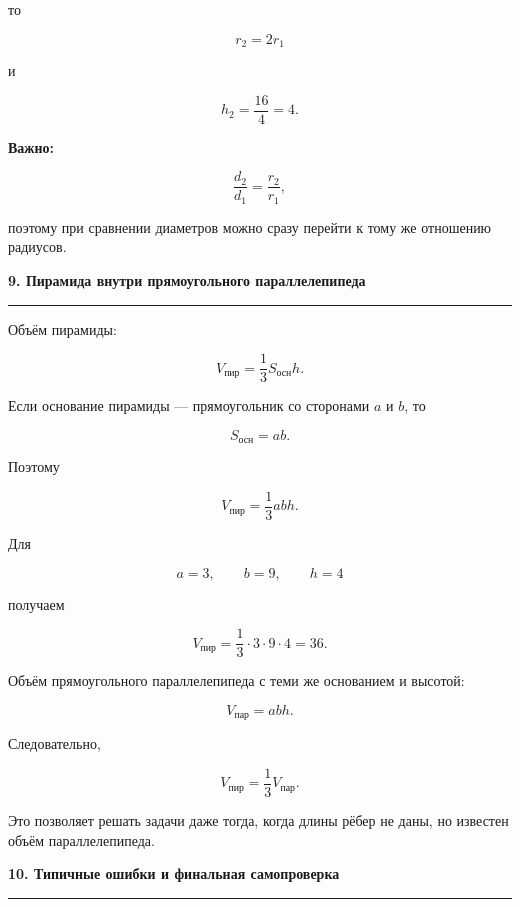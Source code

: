 \documentclass[a4paper,12pt]{article}
\newcommand{\topic}[1]{%
  \vspace{0.8em}
  {\Large\bfseries\textcolor{darkaccent}{#1}}\par
  \vspace{0.25em}
  {\color{accent}\rule{\linewidth}{0.6pt}}
  \vspace{0.45em}
}
\newcommand{\key}[1]{\textcolor{darkaccent}{\textbf{#1}}}
\begin{document}
то

\[
r_2=2r_1
\]

и

\[
h_2
=
\frac{16}{4}
=
\boxed{4}.
\]

\key{Важно:}

\[
\frac{d_2}{d_1}
=
\frac{r_2}{r_1},
\]

поэтому при сравнении диаметров можно сразу перейти к тому же отношению радиусов.


\topic{9. Пирамида внутри прямоугольного параллелепипеда}

Объём пирамиды:

\[
\boxed{
V_{\text{пир}}
=
\frac13S_{\text{осн}}h.
}
\]

Если основание пирамиды --- прямоугольник со сторонами \(a\) и \(b\), то

\[
S_{\text{осн}}=ab.
\]

Поэтому

\[
\boxed{
V_{\text{пир}}
=
\frac13abh.
}
\]

Для

\[
a=3,
\qquad
b=9,
\qquad
h=4
\]

получаем

\[
V_{\text{пир}}
=
\frac13\cdot3\cdot9\cdot4
=
\boxed{36}.
\]

Объём прямоугольного параллелепипеда с теми же основанием и высотой:

\[
V_{\text{пар}}=abh.
\]

Следовательно,

\[
\boxed{
V_{\text{пир}}
=
\frac13V_{\text{пар}}.
}
\]

Это позволяет решать задачи даже тогда, когда длины рёбер не даны, но известен объём параллелепипеда.


\topic{10. Типичные ошибки и финальная самопроверка}
\end{document}
